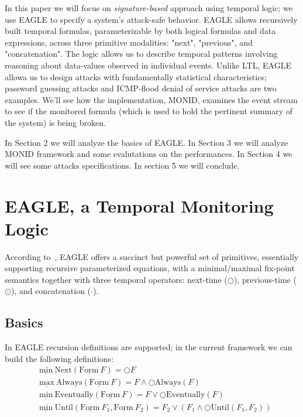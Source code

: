 \documentclass[english]{article}
\begin{document}
In this paper we will focus on \textit{signature-based} approach using temporal logic; we use EAGLE\cite{barringer2004rule,barringer2003eagle} to specify a system's attack-safe behavior. EAGLE allows recursively built temporal formulas, parameterizable by both logical formulas and data expressions, across three primitive modalities: "next", "previous", and "concatenation". The logic allows us to describe temporal patterns involving reasoning about data-values observed in individual events. Unlike LTL, EAGLE allowa us to design attacks with fundamentally statistical characteristics; password guessing attacks and ICMP-flood denial of service attacks are two examples. 
We'll see how the implementation, MONID, examines the event stream to see if the monitored formula (which is used to hold the pertinent summary of the system) is being broken.


In Section 2 we will analyze the basics of EAGLE. In Section 3 we will analyze MONID framework and some evalutations on the performances. In Section 4 we will see some attacks specifications. In section 5 we will conclude.

\section{EAGLE, a Temporal Monitoring Logic}
According to~\cite{barringer2004program}, EAGLE offers a succinct but powerful set of primitives, essentially supporting recursive parameterized equations, with a minimal/maximal fix-point semantics together with three temporal operators: next-time ($\bigcirc$), previous-time ($\odot$), and concatenation ($\cdot$).
\subsection{Basics}
In EAGLE recursion definitions are supported; in the current framework we can build the following definitions:
\begin{align*}
& \underline{\text{min}}\ \text{Next}(\underline{\text{Form}}\ F) = \bigcirc F \\
& \underline{\text{max}}\ \text{Always}(\underline{\text{Form}}\ F) = F \land \bigcirc \text{Always}(F) \\
& \underline{\text{min}}\ \text{Eventually}(\underline{\text{Form}}\ F) = F \lor \bigcirc \text{Eventually}(F) \\
& \underline{\text{min}}\ \text{Until}(\underline{\text{Form}}\ F_1, \underline{\text{Form}}\ F_2) = F_2 \lor (F_1 \land \bigcirc \text{Until}(F_1,F_2))
\end{align*}
\end{document}
